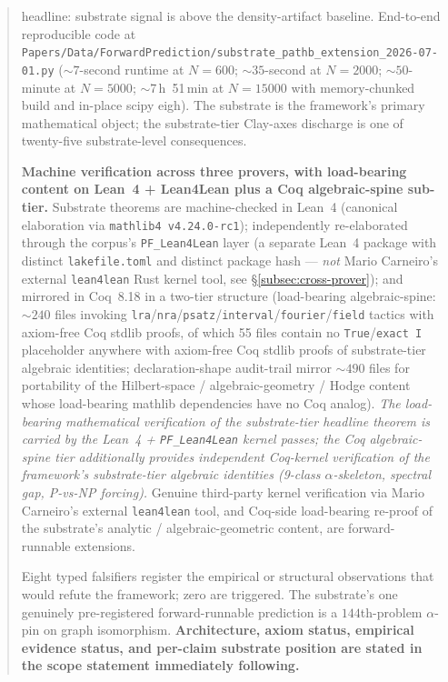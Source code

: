 \documentclass[11pt,a4paper]{amsart}
\theoremstyle{plain}
\theoremstyle{definition}
\begin{document}
\begin{abstract}
headline: substrate signal is above the density-artifact baseline. End-to-end reproducible code at \texttt{Papers/Data/ForwardPrediction/substrate\_pathb\_extension\_2026-07-01.py} ($\sim 7$-second runtime at $N=600$; $\sim 35$-second at $N=2000$; $\sim 50$-minute at $N=5000$; $\sim$7\,h~51\,min at $N=15000$ with memory-chunked build and in-place scipy eigh). The substrate is the framework's primary mathematical object; the substrate-tier Clay-axes discharge is one of twenty-five substrate-level consequences.

\textbf{Machine verification across three provers, with load-bearing content on Lean~4 + Lean4Lean plus a Coq algebraic-spine sub-tier.} Substrate theorems are machine-checked in Lean~4 (canonical elaboration via \texttt{mathlib4 v4.24.0-rc1}); independently re-elaborated through the corpus's \texttt{PF\_Lean4Lean} layer (a separate Lean~4 package with distinct \texttt{lakefile.toml} and distinct package hash --- \emph{not} Mario Carneiro's external \texttt{lean4lean} Rust kernel tool, see \S\ref{subsec:cross-prover}); and mirrored in Coq~8.18 in a two-tier structure (load-bearing algebraic-spine: $\sim 240$ files invoking \texttt{lra}/\texttt{nra}/\texttt{psatz}/\texttt{interval}/\texttt{fourier}/\texttt{field} tactics with axiom-free Coq stdlib proofs, of which 55 files contain no \texttt{True}/\texttt{exact I} placeholder anywhere with axiom-free Coq stdlib proofs of substrate-tier algebraic identities; declaration-shape audit-trail mirror $\sim 490$ files for portability of the Hilbert-space / algebraic-geometry / Hodge content whose load-bearing mathlib dependencies have no Coq analog). \emph{The load-bearing mathematical verification of the substrate-tier headline theorem is carried by the Lean~4 + \texttt{PF\_Lean4Lean} kernel passes; the Coq algebraic-spine tier additionally provides independent Coq-kernel verification of the framework's substrate-tier algebraic identities (9-class $\alpha$-skeleton, spectral gap, P-vs-NP forcing).} Genuine third-party kernel verification via Mario Carneiro's external \texttt{lean4lean} tool, and Coq-side load-bearing re-proof of the substrate's analytic / algebraic-geometric content, are forward-runnable extensions.

Eight typed falsifiers register the empirical or structural observations that would refute the framework; zero are triggered. The substrate's one genuinely pre-registered forward-runnable prediction is a $144$th-problem $\alpha$-pin on graph isomorphism. \textbf{Architecture, axiom status, empirical evidence status, and per-claim substrate position are stated in the scope statement immediately following.}
\end{abstract}
\end{document}

